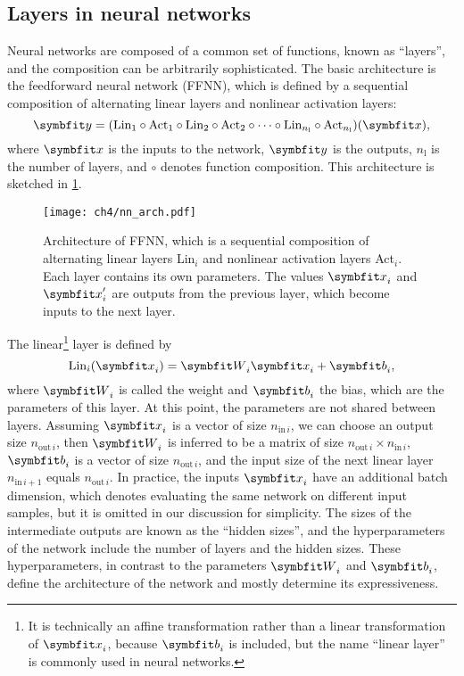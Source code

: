 \subsection{Layers in neural networks}

Neural networks are composed of a common set of functions, known as ``layers'', and the composition can be arbitrarily sophisticated. The basic architecture is the feedforward neural network (FFNN), which is defined by a sequential composition of alternating linear layers and nonlinear activation layers:
\begin{equation}
\vy = (\text{Lin}_1 \circ \text{Act}_1 \circ \text{Lin}_2 \circ \text{Act}_2 \circ \cdots \circ \text{Lin}_{n_\text{l}} \circ \text{Act}_{n_\text{l}})(\vx),
\label{eq:ffnn}
\end{equation}
where $\vx$ is the inputs to the network, $\vy$ is the outputs, $n_\text{l}$ is the number of layers, and $\circ$ denotes function composition. This architecture is sketched in \cref{fig:nn-arch}.

\begin{figure}[htb]
\centering
\texttt{[image: ch4/nn\_arch.pdf]}
\caption[Architecture of feedforward neural network (FFNN)]{
Architecture of FFNN, which is a sequential composition of alternating linear layers Lin$_i$ and nonlinear activation layers Act$_i$. Each layer contains its own parameters. The values $\vx_i$ and $\vx'_i$ are outputs from the previous layer, which become inputs to the next layer.
}
\label{fig:nn-arch}
\end{figure}

The linear\footnote{It is technically an affine transformation rather than a linear transformation of $\vx_i$, because $\vb_i$ is included, but the name ``linear layer'' is commonly used in neural networks.} layer is defined by
\begin{equation}
\text{Lin}_i(\vx_i) = \mW_i \vx_i + \vb_i,
\label{eq:linear-layer}
\end{equation}
where $\mW_i$ is called the weight and $\vb_i$ the bias, which are the parameters of this layer. At this point, the parameters are not shared between layers. Assuming $\vx_i$ is a vector of size $n_{\text{in}\,i}$, we can choose an output size $n_{\text{out}\,i}$, then $\mW_i$ is inferred to be a matrix of size $n_{\text{out}\,i} \times n_{\text{in}\,i}$, $\vb_i$ is a vector of size $n_{\text{out}\,i}$, and the input size of the next linear layer $n_{\text{in}\,i + 1}$ equals $n_{\text{out}\,i}$.
In practice, the inputs $\vx_i$ have an additional batch dimension, which denotes evaluating the same network on different input samples, but it is omitted in our discussion for simplicity. The sizes of the intermediate outputs are known as the ``hidden sizes'', and the hyperparameters of the network include the number of layers and the hidden sizes. These hyperparameters, in contrast to the parameters $\mW_i$ and $\vb_i$, define the architecture of the network and mostly determine its expressiveness.

